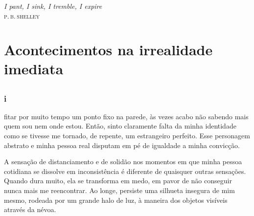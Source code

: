 \chapter*{}
\thispagestyle{empty}

\vfill
\begin{flushright}
\textit{I pant, I sink, I tremble, I expire}\\
\textsc{p.\,b.\,shelley}
\end{flushright}

\part[Acontecimentos na irrealidade imediata]{Acontecimentos na\break
 irrealidade imediata}

\chapter*{}

\section{i}

 fitar por muito tempo um ponto fixo na parede, às vezes acabo não
 sabendo mais quem sou nem onde estou. Então, sinto claramente falta da minha
 identidade como se tivesse me tornado, de repente, um estrangeiro perfeito.
 Esse personagem abstrato e minha pessoa real disputam em pé de igualdade a
 minha convicção.


A sensação de distanciamento e de solidão nos momentos em que minha pessoa
cotidiana se dissolve em inconsistência é diferente de quaisquer outras
sensações. Quando dura muito, ela se transforma em medo, em pavor de não
conseguir nunca mais me reencontrar. Ao longe, persiste uma silhueta insegura
de mim mesmo, rodeada por um grande halo de luz, à maneira dos objetos
visíveis através da névoa.

